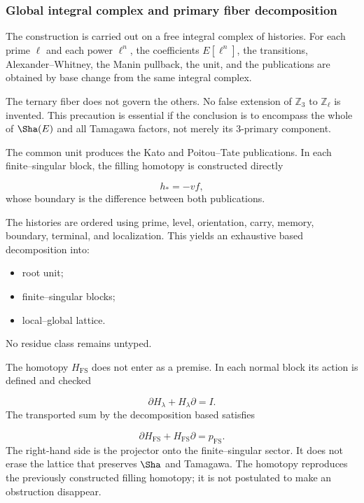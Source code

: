 \subsubsection{Global integral complex and primary fiber decomposition}
The construction is carried out on a free integral complex of histories. For each prime \(\ell\) and each power \(\ell^n\), the coefficients \(E[\ell^n]\), the transitions, Alexander–Whitney, the Manin pullback, the unit, and the publications are obtained by base change from the same integral complex.\par
The ternary fiber does not govern the others. No false extension of \(\mathbb Z_3\) to \(\mathbb Z_\ell\) is invented. This precaution is essential if the conclusion is to encompass the whole of \(\Sha(E)\) and all Tamagawa factors, not merely its \(3\)-primary component.\par
The common unit produces the Kato and Poitou–Tate publications. In each finite--singular block, the filling homotopy is constructed directly\par
\[
h_*=-vf,
\]
whose boundary is the difference between both publications.\par
The histories are ordered using prime, level, orientation, carry, memory, boundary, terminal, and localization. This yields an exhaustive based decomposition into:\par
\begin{itemize}
\item root unit;
\item finite–singular blocks;
\item local--global lattice.
\end{itemize}
No residue class remains untyped.\par
The homotopy \(H_{\mathrm{FS}}\) does not enter as a premise. In each normal block its action is defined and checked\par
\[
\partial H_\lambda+H_\lambda\partial=I.
\]
The transported sum by the decomposition based satisfies\par
\[
\partial H_{\mathrm{FS}}
+
H_{\mathrm{FS}}\partial
=
p_{\mathrm{FS}}.
\]
The right-hand side is the projector onto the finite–singular sector. It does not erase the lattice that preserves \(\Sha\) and Tamagawa. The homotopy reproduces the previously constructed filling homotopy; it is not postulated to make an obstruction disappear.\par
{}
